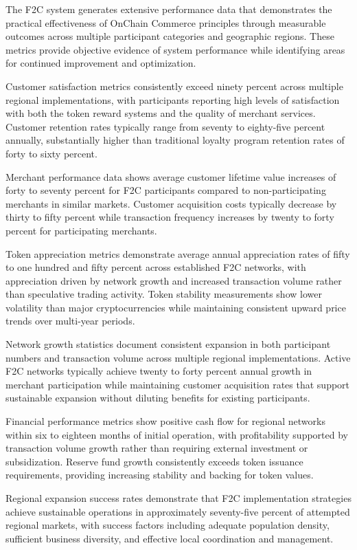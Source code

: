 \documentclass[
  Letterpaper,
]{scrbook}
\begin{document}
The F2C system generates extensive performance data that demonstrates
the practical effectiveness of OnChain Commerce principles through
measurable outcomes across multiple participant categories and
geographic regions. These metrics provide objective evidence of system
performance while identifying areas for continued improvement and
optimization.

Customer satisfaction metrics consistently exceed ninety percent across
multiple regional implementations, with participants reporting high
levels of satisfaction with both the token reward systems and the
quality of merchant services. Customer retention rates typically range
from seventy to eighty-five percent annually, substantially higher than
traditional loyalty program retention rates of forty to sixty percent.

Merchant performance data shows average customer lifetime value
increases of forty to seventy percent for F2C participants compared to
non-participating merchants in similar markets. Customer acquisition
costs typically decrease by thirty to fifty percent while transaction
frequency increases by twenty to forty percent for participating
merchants.

Token appreciation metrics demonstrate average annual appreciation rates
of fifty to one hundred and fifty percent across established F2C
networks, with appreciation driven by network growth and increased
transaction volume rather than speculative trading activity. Token
stability measurements show lower volatility than major cryptocurrencies
while maintaining consistent upward price trends over multi-year
periods.

Network growth statistics document consistent expansion in both
participant numbers and transaction volume across multiple regional
implementations. Active F2C networks typically achieve twenty to forty
percent annual growth in merchant participation while maintaining
customer acquisition rates that support sustainable expansion without
diluting benefits for existing participants.

Financial performance metrics show positive cash flow for regional
networks within six to eighteen months of initial operation, with
profitability supported by transaction volume growth rather than
requiring external investment or subsidization. Reserve fund growth
consistently exceeds token issuance requirements, providing increasing
stability and backing for token values.

Regional expansion success rates demonstrate that F2C implementation
strategies achieve sustainable operations in approximately seventy-five
percent of attempted regional markets, with success factors including
adequate population density, sufficient business diversity, and
effective local coordination and management.
\end{document}
